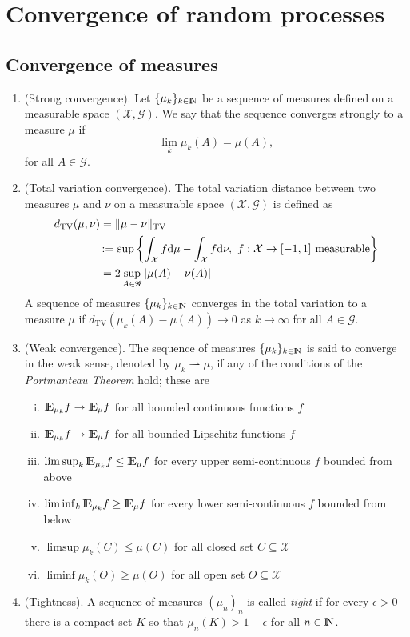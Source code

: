 \documentclass[a4paper,10pt]{article}
\begin{document}
\section{Convergence of random processes}
\subsection{Convergence of measures}
\begin{enumerate}
 \item (Strong convergence). Let $\{\mu_k\}_{k\in\N}$ be a sequence of measures defined on a 
       measurable space $(\mathcal{X}, \mathscr{G})$. We say that the sequence converges strongly
       to a measure $\mu$ if
       \[
        \lim_k \mu_k(A) = \mu(A),
       \]
      for all $A\in\mathscr{G}$.
 \item (Total variation convergence). The total variation distance between two measures $\mu$ and 
       $\nu$ on a measurable space $(\mathcal{X}, \mathscr{G})$ is defined as
       \begin{align*}
        d_{\mathrm{TV}}(\mu,\nu) &= \|\mu-\nu\|_{\mathrm{TV}} \\
          &{}\mathop{\mathrel{:}=}{} \sup \left\{\int_{\mathcal{X}}f\mathrm{d}\mu - \int_{\mathcal{X}}f \mathrm{d} \nu,\ f:\mathcal{X}\to[-1,1] \text{ measurable} \right\}\\
          &=2\sup_{A\in\mathscr{G}}|\mu(A) - \nu(A)|
       \end{align*}
      A sequence of measures $\{\mu_k\}_{k\in\N}$ converges in the total variation
      to a measure $\mu$ if $d_{\mathrm{TV}}(\mu_k(A)-\mu(A))\to 0$ as $k\to\infty$
      for all $A\in\mathscr{G}$.
 \item (Weak convergence). The sequence of measures $\{\mu_k\}_{k\in\N}$ is said to converge 
       in the weak sense, denoted by $\mu_k \rightharpoonup \mu$, if any of the conditions 
       of the \textit{Portmanteau Theorem} hold; these are
       \begin{enumerate}[i.]
        \item $\E_{\mu_k} f\to \E_{\mu} f$ for all bounded continuous functions $f$
        \item $\E_{\mu_k} f\to \E_{\mu} f$ for all bounded Lipschitz functions $f$
        \item $\limsup_k\E_{\mu_k} f \leq \E_{\mu} f$ for every upper semi-continuous $f$ bounded from above
        \item $\liminf_k\E_{\mu_k} f \geq \E_{\mu} f$ for every lower semi-continuous $f$ bounded from below
        \item $\limsup \mu_k(C) \leq \mu(C)$ for all closed set $C\subseteq \mathcal{X}$
        \item $\liminf \mu_k(O) \geq \mu(O)$ for all open set $O\subseteq \mathcal{X}$
       \end{enumerate}
 \item (Tightness). A sequence of measures $(\mu_n)_n$ is called \textit{tight} if for every $\epsilon>0$
       there is a compact set $K$ so that $\mu_n(K)>1-\epsilon$ for all $n\in\N$.
       

\end{enumerate}
\end{document}
